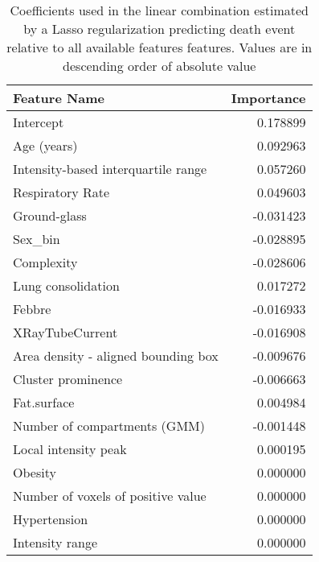 \begin{table}
	\caption{Coefficients used in the linear combination estimated by a Lasso regularization predicting death event relative to all available features features. Values are in descending order of absolute value\label{tab:ParamAll}}
		\centering
			\begin{tabular}{lr}
			\toprule
			Feature Name &  Importance \\
			\midrule
			Intercept                           &                      0.178899 \\
			Age (years)                         &                      0.092963 \\
			Intensity-based interquartile range &                      0.057260 \\
			Respiratory Rate                    &                      0.049603 \\
			Ground-glass                        &                     -0.031423 \\
			Sex\_bin                             &                     -0.028895 \\
			Complexity                          &                     -0.028606 \\
			Lung consolidation                  &                      0.017272 \\
			Febbre                              &                     -0.016933 \\
			XRayTubeCurrent                     &                     -0.016908 \\
			Area density - aligned bounding box &                     -0.009676 \\
			Cluster prominence                  &                     -0.006663 \\
			Fat.surface                         &                      0.004984 \\
			Number of compartments (GMM)        &                     -0.001448 \\
			Local intensity peak                &                      0.000195 \\
			Obesity                             &                      0.000000 \\
			Number of voxels of positive value  &                      0.000000 \\
			Hypertension                        &                      0.000000 \\
			Intensity range                     &                      0.000000 \\

\end{tabular}
\end{table}
